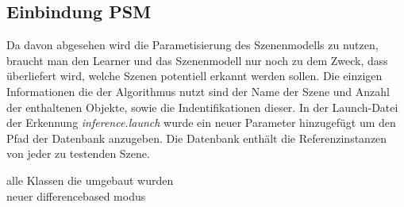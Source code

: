 \subsection{Einbindung PSM}
Da davon abgesehen wird die Parametisierung des Szenenmodells zu nutzen, braucht man den Learner und das Szenenmodell nur noch zu dem Zweck, dass überliefert wird, welche Szenen potentiell erkannt werden sollen. Die einzigen Informationen die der Algorithmus nutzt sind der Name der Szene und Anzahl der enthaltenen Objekte, sowie die Indentifikationen dieser.
In der Launch-Datei der Erkennung \textit{inference.launch} wurde ein neuer Parameter hinzugefügt um den Pfad der Datenbank anzugeben. Die Datenbank enthält die Referenzinstanzen von jeder zu testenden Szene.

alle Klassen die umgebaut wurden\\
neuer differencebased modus \\

